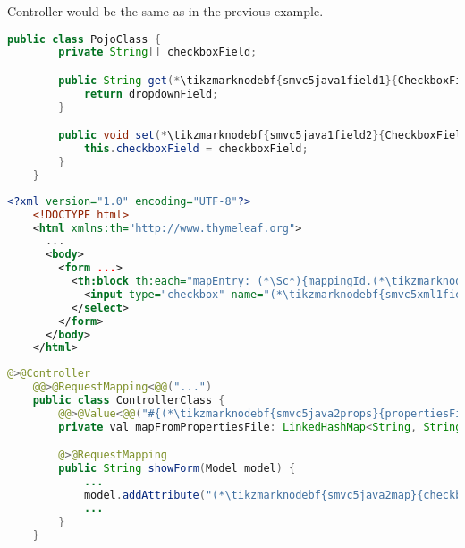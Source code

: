 \notenonl Controller would be the same as in the previous example.
\newpage

\enlargethispage{10mm}
\begin{lstlisting}[language=Java, title={POJO class with one array field}]
    public class PojoClass {
        private String[] checkboxField;

        public String get(*\tikzmarknodebf{smvc5java1field1}{CheckboxField}*)() {
            return dropdownField;
        }

        public void set(*\tikzmarknodebf{smvc5java1field2}{CheckboxField}*)(String[] checkboxField) {
            this.checkboxField = checkboxField;
        }
    }
\end{lstlisting}
\begin{lstlisting}[language=XML, title={HTML form setting the field}]
    <?xml version="1.0" encoding="UTF-8"?>
    <!DOCTYPE html>
    <html xmlns:th="http://www.thymeleaf.org">
      ...
      <body>
        <form ...>
          <th:block th:each="mapEntry: (*\Sc*){mappingId.(*\tikzmarknodebf{smvc5xml1map}{checkboxMap}[ForestGreen]*).entrySet()}">
            <input type="checkbox" name="(*\tikzmarknodebf{smvc5xml1field}{checkboxField}[ForestGreen]*)" th:value="(*\Sc*){mapEntry.key}"><span th:text="(*\Sc*){mapEntry.value}"/><br/>
          </select>
        </form>
      </body>
    </html>
\end{lstlisting}
\begin{lstlisting}[language=Java, title={Controller converting \textit{properties} file to a map}]
    @>@Controller
    @@>@RequestMapping<@@("...")
    public class ControllerClass {
        @@>@Value<@@("#{(*\tikzmarknodebf{smvc5java2props}{propertiesFileId}[ForestGreen]*)}") // Parsing the properties file
        private val mapFromPropertiesFile: LinkedHashMap<String, String>;

        @>@RequestMapping
        public String showForm(Model model) {
            ...
            model.addAttribute("(*\tikzmarknodebf{smvc5java2map}{checkboxMap}[ForestGreen]*)", mapFromPropertiesFile)
            ...
        }
    }
\end{lstlisting}
\newpage

